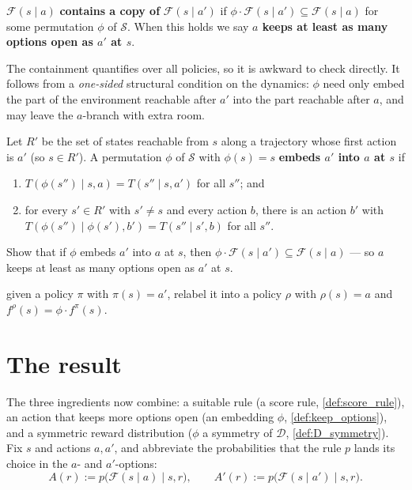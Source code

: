\documentclass[11pt]{article}
\newcommand{\cS}{\mathcal{S}}
\newcommand{\Dist}{\mathcal{D}}    %
\newcommand{\F}{\mathcal{F}}       %
\begin{document}
\begin{definition}\label{def:keep_options}
$\F(s\mid a)$ \textbf{contains a copy of} $\F(s\mid a')$ if $\phi \cdot \F(s\mid a') \subseteq \F(s\mid a)$
for some permutation $\phi$ of $\cS$. When this holds we say \textbf{$a$ keeps at least as many
options open as $a'$ at $s$}.
\end{definition}


The containment quantifies over all policies, so it is awkward to check directly. It follows from a
\emph{one-sided} structural condition on the dynamics: $\phi$ need only embed the part of the
environment reachable after $a'$ into the part reachable after $a$, and may leave the $a$-branch
with extra room.

\begin{definition}\label{def:dyn_embedding}
Let $R'$ be the set of states reachable from $s$ along a trajectory whose first action is $a'$
(so $s \in R'$). A permutation $\phi$ of $\cS$ with $\phi(s) = s$ \textbf{embeds $a'$ into $a$
at $s$} if
\begin{enumerate}
  \item $T(\phi(s'') \mid s, a) = T(s'' \mid s, a')$ for all $s''$; and
  \item for every $s' \in R'$ with $s' \ne s$ and every action $b$, there is an action
  $b'$ with $T(\phi(s'') \mid \phi(s'), b') = T(s'' \mid s', b)$ for all $s''$.
\end{enumerate}
\end{definition}

\begin{exercise}
\label{prob:embedding_gives_copy} Show that if $\phi$ embeds $a'$ into $a$ at
$s$, then $\phi \cdot \F(s\mid a') \subseteq \F(s\mid a)$ --- so $a$ keeps at least as many
options open as $a'$ at $s$.
\end{exercise}
\begin{hint}
given a policy $\pi$ with $\pi(s)=a'$, relabel it into a policy $\rho$ with
$\rho(s)=a$ and $f^\rho(s) = \phi \cdot f^\pi(s)$.
\end{hint}


\section*{The result}

The three ingredients now combine: a suitable rule (a score rule, \cref{def:score_rule}), an action
that keeps more options open (an embedding $\phi$, \cref{def:keep_options}), and a symmetric reward
distribution ($\phi$ a symmetry of $\Dist$, \cref{def:D_symmetry}). Fix $s$ and actions $a,a'$, and
abbreviate the probabilities that the rule $p$ lands its choice in the $a$- and $a'$-options:
$$
A(r) := p\bigl(\F(s\mid a)\mid s,r\bigr), \qquad A'(r) := p\bigl(\F(s\mid a')\mid s,r\bigr).
$$
\end{document}
